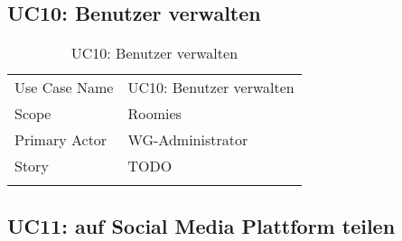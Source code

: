 \subsection{UC10: Benutzer verwalten}
\begin{table}[H]
	\tablestyle
	\tablealtcolored
	\begin{tabularx}{\textwidth}{lX}
		\tablebody
			Use Case Name &
			UC10: Benutzer verwalten
			\tabularnewline
			Scope &
			Roomies
			\tabularnewline
			Primary Actor &
			WG-Administrator
			\tabularnewline
			Story &
			TODO
			\tabularnewline
		\tableend
	\end{tabularx}
	\caption{UC10: Benutzer verwalten}
\end{table}


\subsection{UC11: auf Social Media Plattform teilen}

